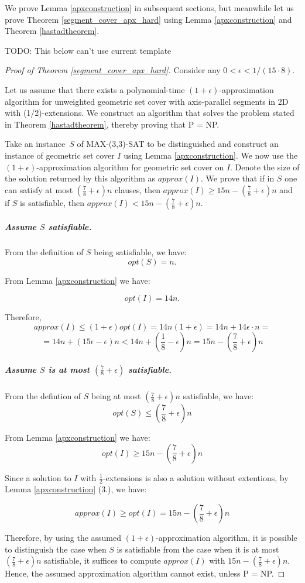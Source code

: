We prove Lemma \ref{apxconstruction} in
subsequent sections, but meanwhile let us prove
Theorem \ref{segment_cover_apx_hard} using Lemma \ref{apxconstruction}
and Theorem \ref{hastadtheorem}.

TODO: This below can't use current template

\begin{proof}[Proof of Theorem \ref{segment_cover_apx_hard}]\leavevmode

Consider any $0 < \epsilon < 1/(15 \cdot 8)$.

Let us assume that there exists a polynomial-time
$(1+\epsilon)$-approximation algorithm
for unweighted geometric set cover with axis-parallel segments in 2D
with (1/2)-extensions.
We construct an algorithm that solves the problem stated in 
Theorem \ref{hastadtheorem}, thereby proving that P = NP.

Take an instance~$S$ of MAX-(3,3)-SAT to be distinguished
and construct an instance of geometric set cover $I$
using Lemma \ref{apxconstruction}.
We now use the $(1+\epsilon)$-approximation algorithm
for geometric set cover on $I$.
Denote the size of the solution returned by this algorithm as $approx(I)$.
We prove that 
if in $S$
one can satisfy at most $(\frac{7}{8}+\epsilon)n$ clauses,
then $approx(I) \ge 15n - (\frac{7}{8} + \epsilon)n$
and if $S$ is
satisfiable, then $approx(I) < 15n - (\frac{7}{8} + \epsilon)n$.

\subparagraph{Assume $S$ satisfiable.}
From the definition of $S$ being satisfiable, we have:
$$opt(S) = n.$$

From Lemma \ref{apxconstruction} we have:

$$opt(I) = 14n.$$

Therefore,
$$approx(I) \le (1+\epsilon)opt(I) = 14n(1+\epsilon)
	= 14n + 14\epsilon\cdot n =$$ 
	$$= 14n + (15\epsilon - \epsilon)n < 
  14n + \left(\frac{1}{8} - \epsilon\right)n 
= 15n - \left(\frac{7}{8} + \epsilon\right)n$$

\subparagraph{Assume $S$ is at most 
$\left(\frac{7}{8} + \epsilon\right)$ satisfiable.}
From the defintion of $S$ being at most 
$\left(\frac{7}{8} + \epsilon\right)n$ satisfiable, we have:
$$opt(S) \le \left(\frac{7}{8} + \epsilon\right)n$$

From Lemma \ref{apxconstruction} we have:
$$opt(I) \ge 15n - \left(\frac{7}{8} + \epsilon\right)n$$

Since a solution to $I$ with $\frac{1}{2}$-extensions is
also a solution without extentions, by 
Lemma \ref{apxconstruction} (3.), we have:

$$approx(I) \ge opt(I) = 15n - \left(\frac{7}{8} + \epsilon\right)n$$


Therefore, by using the assumed $(1+\epsilon)$-approximation
algorithm,
it is possible to distinguish the case when
$S$ is satisfiable from the case when it is
at most $(\frac{7}{8} + \epsilon)n$ satisfiable,
it suffices to compute $approx(I)$ with $15n - (\frac{7}{8}+\epsilon)n$.
Hence, the assumed approximation algorithm cannot exist, unless P = NP.
\end{proof}

